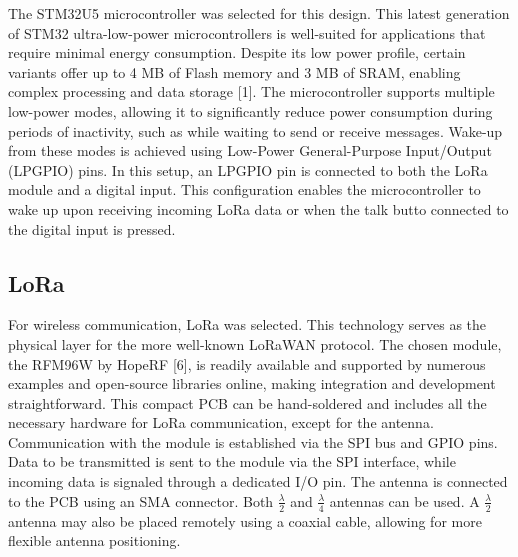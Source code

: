 The STM32U5 microcontroller was selected for this design. This latest generation of STM32 ultra-low-power microcontrollers is well-suited for applications that require minimal energy consumption.
Despite its low power profile, certain variants offer up to 4 MB of Flash memory and 3 MB of SRAM, enabling complex processing and data storage [1].
The microcontroller supports multiple low-power modes, allowing it to significantly reduce power consumption during periods of inactivity, such as while waiting to send or receive messages.
Wake-up from these modes is achieved using Low-Power General-Purpose Input/Output (LPGPIO) pins.
In this setup, an LPGPIO pin is connected to both the LoRa module and a digital input. This configuration enables the microcontroller to wake up upon receiving incoming LoRa data or when the talk butto connected to the digital input is pressed.

\subsection{LoRa}


For wireless communication, LoRa was selected. This technology serves as the physical layer for the more well-known LoRaWAN protocol.
The chosen module, the RFM96W by HopeRF [6], is readily available and supported by numerous examples and open-source libraries online, making integration and development straightforward.
This compact PCB can be hand-soldered and includes all the necessary hardware for LoRa communication, except for the antenna.
Communication with the module is established via the SPI bus and GPIO pins.
Data to be transmitted is sent to the module via the SPI interface, while incoming data is signaled through a dedicated I/O pin.
The antenna is connected to the PCB using an SMA connector. Both $\frac{\lambda}{2}$ and $\frac{\lambda}{4}$ antennas can be used.
A $\frac{\lambda}{2}$ antenna may also be placed remotely using a coaxial cable, allowing for more flexible antenna positioning.

